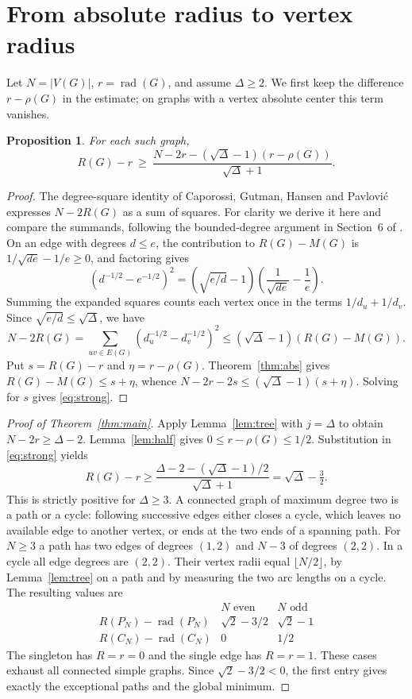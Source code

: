 \documentclass[11pt,a4paper]{article}
\newtheorem{proposition}[theorem]{Proposition}
\newcommand{\rad}{\operatorname{rad}}
\begin{document}
\section{From absolute radius to vertex radius}\label{sec:finish}
Let $N=|V(G)|$, $r=\rad(G)$, and assume $\Delta\ge2$. We first keep
the difference $r-\rho(G)$ in the estimate; on graphs with a vertex
absolute center this term vanishes.
\begin{proposition}\label{prop:energy}
For each such graph,
\begin{equation}\label{eq:strong}
 R(G)-r \ \ge\
 \frac{N-2r-(\sqrt{\Delta}-1)(r-\rho(G))}{\sqrt{\Delta}+1}.
\end{equation}
\end{proposition}
\begin{proof}
The degree-square identity of Caporossi, Gutman, Hansen and
Pavlovi\'c \cite{CGHP} expresses $N-2R(G)$ as a sum of squares.
For clarity we derive it here and compare the summands, following the
bounded-degree argument in Section~6 of \cite{CPS}. On an edge with
degrees $d\le e$, the contribution to $R(G)-M(G)$ is
$1/\sqrt{de}-1/e\ge0$, and factoring gives
\[
 (d^{-1/2}-e^{-1/2})^2
  =(\sqrt{e/d}-1)\left(\frac1{\sqrt{de}}-\frac1e\right).
\]
Summing the expanded squares counts each vertex once in the terms
$1/d_u+1/d_v$. Since $\sqrt{e/d}\le\sqrt{\Delta}$, we have
\[
 N-2R(G)=\sum_{uv\in E(G)}(d_u^{-1/2}-d_v^{-1/2})^2
 \le(\sqrt{\Delta}-1)(R(G)-M(G)).
\]
Put $s=R(G)-r$ and $\eta=r-\rho(G)$. Theorem~\ref{thm:abs} gives
$R(G)-M(G)\le s+\eta$, whence
$N-2r-2s\le(\sqrt{\Delta}-1)(s+\eta)$. Solving for $s$
gives \eqref{eq:strong}.
\end{proof}

\begin{proof}[Proof of Theorem~\ref{thm:main}]
Apply Lemma~\ref{lem:tree} with $j=\Delta$ to obtain $N-2r\ge\Delta-2$.
Lemma~\ref{lem:half} gives $0\le r-\rho(G)\le1/2$.
Substitution in \eqref{eq:strong} yields
\[
 R(G)-r\ge
 \frac{\Delta-2-(\sqrt{\Delta}-1)/2}{\sqrt{\Delta}+1}
 =\sqrt{\Delta}-\tfrac32 .
\]
This is strictly positive for $\Delta\ge3$. A connected graph of
maximum degree two is a path or a cycle: following successive edges
either closes a cycle, which leaves no available edge to another
vertex, or ends at the two ends of a spanning path. For $N\ge3$ a
path has two edges of degrees $(1,2)$ and $N-3$ of degrees $(2,2)$.
In a cycle all edge degrees are $(2,2)$. Their vertex radii equal
$\lfloor N/2\rfloor$, by Lemma~\ref{lem:tree} on a path and by measuring
the two arc lengths on a cycle. The resulting values are
\[
\begin{array}{c|cc}
 & N\text{ even}&N\text{ odd}\\ \hline
 R(P_N)-\rad(P_N) & \sqrt2-3/2 & \sqrt2-1\\
 R(C_N)-\rad(C_N) & 0 & 1/2
\end{array}
\]
The singleton has $R=r=0$ and the single edge has $R=r=1$.
These cases exhaust all connected simple graphs. Since
$\sqrt2-3/2<0$, the first entry gives exactly the exceptional paths
and the global minimum.
\end{proof}
\end{document}
